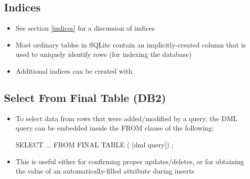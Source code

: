 \documentclass[a4paper]{article}
\begin{document}
\subsection{Indices}
\begin{itemize}
	\item See section \ref{indices} for a discussion of indices
    \item Most ordinary tables in SQLite contain an implicitly-created  column that is used to uniquely identify rows (for indexing the database)
    \item Additional indices can be created with 
\end{itemize}

\subsection{Select From Final Table (DB2)}
\begin{itemize}
\item To select data from rows that were added/modified by a query, the DML query can be embedded inside the FROM clause of the following:
\begin{sql}
SELECT ...
  FROM FINAL TABLE (
    [dml query])
;
\end{sql}
\item This is useful either for confirming proper updates/deletes, or for obtaining the value of an automatically-filled attribute during inserts
\end{itemize}
\end{document}
